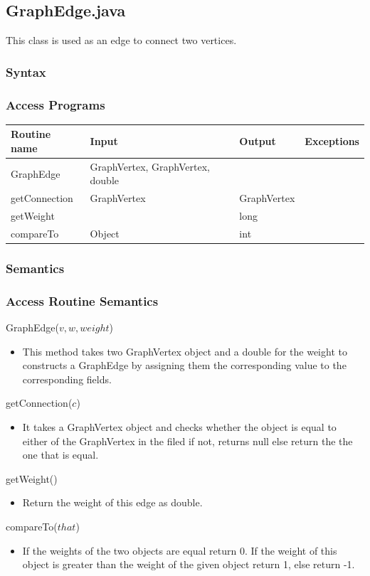 \documentclass[12pt,fleqn]{article}
\begin{document}

\subsection*{GraphEdge.java}\label{edge}
This class is used as an edge to connect two vertices.
\subsubsection* {Syntax}

\subsubsection* {Access Programs}
\begin{tabular}{| l | l | l | l |}
\hline
\textbf{Routine name} & \textbf{Input} & \textbf{Output} & \textbf{Exceptions}\\
\hline
GraphEdge & GraphVertex, GraphVertex, double & ~ & ~\\
\hline
getConnection & GraphVertex & GraphVertex & ~\\
\hline
getWeight & ~ & long & ~\\
\hline
compareTo & Object & int & ~\\
\hline
\end{tabular}

\subsubsection*{Semantics}
\subsubsection*{Access Routine Semantics}
\noindent GraphEdge($v, w, weight$)
\begin{itemize}
\item This method takes two GraphVertex object and a double for the weight to constructs a GraphEdge by
assigning them the corresponding value to the corresponding fields.
\end{itemize}
\noindent getConnection($c$)
\begin{itemize}
\item It takes a GraphVertex object and checks whether the object is equal to either of the GraphVertex in the
filed if not, returns null else return the the one that is equal.
\end{itemize}
\noindent getWeight()
\begin{itemize}
\item Return the weight of this edge as double.
\end{itemize}
\noindent compareTo($that$)
\begin{itemize}
\item If the weights of the two objects are equal return 0. If the weight of this object is greater than the weight
of the given object return 1, else return -1.
\end{itemize}
\end{document}
